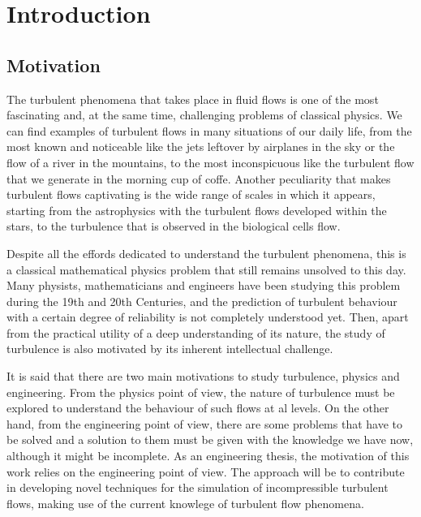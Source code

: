 
\chapter{Introduction}
\label{chap-Introduction}

\section{Motivation}

The turbulent phenomena that takes place in fluid flows is one of the most fascinating and, at the same time, challenging problems of classical physics. We can find examples of turbulent flows in many situations of our daily life, from the most known and noticeable like the jets leftover by airplanes in the sky or the flow of a river in the mountains, to the most inconspicuous like the turbulent flow that we generate in the morning cup of coffe. Another peculiarity that makes turbulent flows captivating is the wide range of scales in which it appears, starting from the astrophysics with the turbulent flows developed within the stars, to the turbulence that is observed in the biological cells flow.

Despite all the effords dedicated to understand the turbulent phenomena, this is a classical mathematical physics problem that still remains unsolved to this day. Many physists, mathematicians and engineers have been studying this problem during the 19th and 20th Centuries, and the prediction of turbulent behaviour with a certain degree of reliability is not completely understood yet. Then, apart from the practical utility of a deep understanding of its nature, the study of turbulence is also motivated by its inherent intellectual challenge.

It is said that there are two main motivations to study turbulence, physics and engineering. From the physics point of view, the nature of turbulence must be explored to understand the behaviour of such flows at al levels. On the other hand, from the engineering point of view, there are some problems that have to be solved and a solution to them must be given with the knowledge we have now, although it might be incomplete. As an engineering thesis, the motivation of this work relies on the engineering point of view. The approach will be to contribute in developing novel techniques for the simulation of incompressible turbulent flows, making use of the current knowlege of turbulent flow phenomena.


